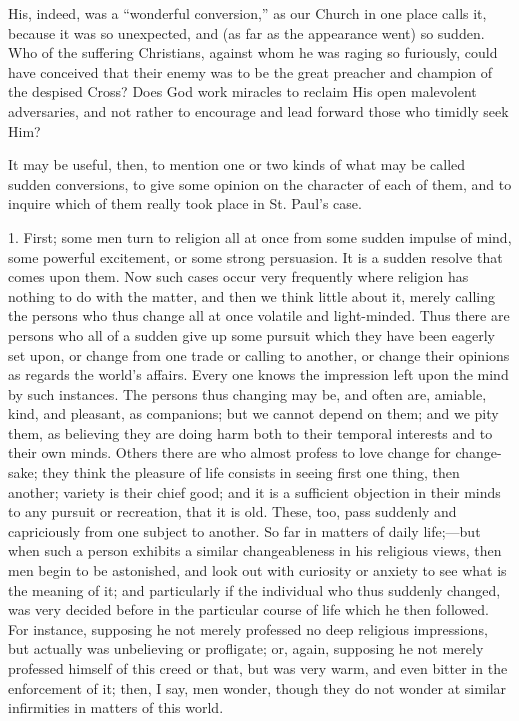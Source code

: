 His, indeed, was a ``wonderful conversion,'' as our Church in one
place calls it, because it was so unexpected, and (as far as the
appearance went) so sudden. Who of the suffering Christians, against
whom he was raging so furiously, could have conceived that their enemy
was to be the great preacher and champion of the despised Cross? Does
God work miracles to reclaim His open malevolent adversaries, and not
rather to encourage and lead forward those who timidly seek Him?

It may be useful, then, to mention one or two kinds of what may be
called sudden conversions, to give some opinion on the character of
each of them, and to inquire which of them really took place in St.
Paul's case.

1. First; some men turn to religion all at once from some sudden
impulse of mind, some powerful excitement, or some strong persuasion.
It is a sudden resolve that comes upon them. Now such cases occur very
frequently where religion has nothing to do with the matter, and then
we think little about it, merely calling the persons who thus change
all at once volatile and light-minded. Thus there are persons who all
of a sudden give up some pursuit which they have been eagerly set
upon, or change from one trade or calling to another, or change their
opinions as regards the world's affairs. Every one knows the
impression left upon the mind by such instances. The persons thus
changing may be, and often are, amiable, kind, and pleasant, as
companions; but we cannot depend on them; and we pity them, as
believing they are doing harm both to their temporal interests and to
their own minds. Others there are who almost profess to love change
for change-sake; they think the pleasure of life consists in seeing
first one thing, then another; variety is their chief good; and it is
a sufficient objection in their minds to any pursuit or recreation,
that it is old. These, too, pass suddenly and capriciously from one
subject to another. So far in matters of daily life;—but when such a
person exhibits a similar changeableness in his religious views, then
men begin to be astonished, and look out with curiosity or anxiety to
see what is the meaning of it; and particularly if the individual who
thus suddenly changed, was very decided before in the particular
course of life which he then followed. For instance, supposing he not
merely professed no deep religious impressions, but actually was
unbelieving or profligate; or, again, supposing he not merely
professed himself of this creed or that, but was very warm, and even
bitter in the enforcement of it; then, I say, men wonder, though they
do not wonder at similar infirmities in matters of this world.

